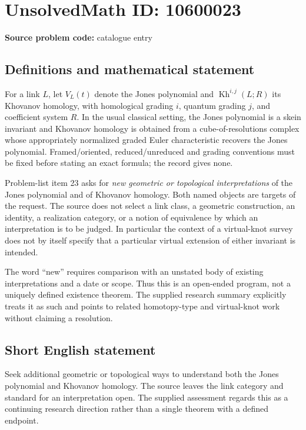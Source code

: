 \documentclass[11pt]{article}
\begin{document}
\section*{UnsolvedMath ID: 10600023}
\textbf{Source problem code:} catalogue entry
\subsection{Definitions and mathematical statement}
For a link \(L\), let \(V_L(t)\) denote the Jones polynomial and \(\operatorname{Kh}^{i,j}(L;R)\) its Khovanov homology, with homological grading \(i\), quantum grading \(j\), and coefficient system \(R\). In the usual classical setting, the Jones polynomial is a skein invariant and Khovanov homology is obtained from a cube-of-resolutions complex whose appropriately normalized graded Euler characteristic recovers the Jones polynomial. Framed/oriented, reduced/unreduced and grading conventions must be fixed before stating an exact formula; the record gives none.

Problem-list item 23 asks for \emph{new geometric or topological interpretations} of the Jones polynomial and of Khovanov homology. Both named objects are targets of the request. The source does not select a link class, a geometric construction, an identity, a realization category, or a notion of equivalence by which an interpretation is to be judged. In particular the context of a virtual-knot survey does not by itself specify that a particular virtual extension of either invariant is intended.

The word ``new'' requires comparison with an unstated body of existing interpretations and a date or scope. Thus this is an open-ended program, not a uniquely defined existence theorem. The supplied research summary explicitly treats it as such and points to related homotopy-type and virtual-knot work without claiming a resolution.
\subsection{Short English statement}
Seek additional geometric or topological ways to understand both the Jones polynomial and Khovanov homology. The source leaves the link category and standard for an interpretation open. The supplied assessment regards this as a continuing research direction rather than a single theorem with a defined endpoint.
\end{document}
